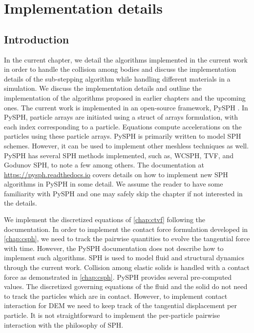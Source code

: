 \chapter{Implementation details}
\label{chap:implementation_detail}
\section{Introduction}
\label{sec:intro}

In the current chapter, we detail the algorithms implemented in the current work
in order to handle the collision among bodies and discuss the implementation
details of the sub-stepping algorithm while handling different materials in a
simulation. We discuss the implementation details and outline the implementation
of the algorithms proposed in earlier chapters and the upcoming ones. The
current work is implemented in an open-source framework, PySPH
\citep{pysph2020}. In PySPH, particle arrays are initiated using a struct of
arrays formulation, with each index corresponding to a particle. Equations
compute accelerations on the particles using these particle arrays. PySPH is
primarily written to model SPH schemes. However, it can be used to implement
other meshless techniques as well. PySPH has several SPH methods implemented,
such as, WCSPH, TVF, and Godunov SPH, to note a few among others. The
documentation at \url{https://pysph.readthedocs.io} covers details on how to
implement new SPH algorithms in PySPH in some detail. We assume the reader to
have some familiarity with PySPH and one may safely skip the chapter if not
interested in the details.


We implement the discretized equations of \cref{chap:ctvf} following the
documentation. In order to implement the contact force formulation developed in
\cref{chap:csph}, we need to track the pairwise quantities to evolve the
tangential force with time. However, the PySPH documentation does not describe
how to implement such algorithms. SPH is used to model fluid and structural
dynamics through the current work. Collision among elastic solids is handled
with a contact force as demonstrated in \cref{chap:csph}. PySPH provides several
pre-computed values. The discretized governing equations of the fluid and the
solid do not need to track the particles which are in contact. However, to
implement contact interaction for DEM we need to keep track of the tangential
displacement per particle. It is not straightforward to implement the
per-particle pairwise interaction with the philosophy of SPH.


